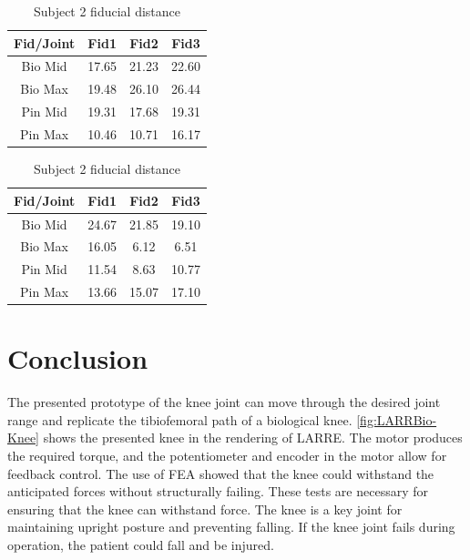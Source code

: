 \begin{table}
\begin{subtable}[c]{0.5\textwidth}
    \centering
        \begin{tabular}{||c | c c c||} 
         \hline
          Fid/Joint & Fid1 & Fid2 & Fid3  \\ [0.5ex] 
         \hline\hline
         Bio Mid & 17.65 & 21.23 & 22.60 \\ 
         \hline
         Bio Max & 19.48 & 26.10 & 26.44 \\
         \hline
         Pin Mid & 19.31 & 17.68 & 19.31 \\
         \hline
         Pin Max & 10.46 & 10.71 & 16.17 \\ [1ex] 
         \hline
        \end{tabular}
    \end{subtable}
        \begin{subtable}[c]{0.5\textwidth}
    \centering
    \begin{tabular}{||c | c c c||} 
         \hline
          Fid/Joint & Fid1 & Fid2 & Fid3  \\ [0.5ex] 
         \hline\hline
         Bio Mid & 24.67 & 21.85 & 19.10 \\ 
         \hline
         Bio Max & 16.05 & 6.12 & 6.51 \\
         \hline
         Pin Mid & 11.54 & 8.63 & 10.77 \\
         \hline
         Pin Max & 13.66 & 15.07 & 17.10 \\ [1ex] 
         \hline
        \end{tabular}
    \end{subtable}
\caption{Subject 2 fiducial distance}
\label{tab:sub2MRI}
\end{table}



\section{Conclusion}

The presented prototype of the knee joint can move through the desired joint range and replicate the tibiofemoral path of a biological knee. \autoref{fig:LARRBio-Knee} shows the presented knee in the rendering of LARRE. The motor produces the required torque, and the potentiometer and encoder in the motor allow for feedback control. The use of FEA showed that the knee could withstand the anticipated forces without structurally failing. These tests are necessary for ensuring that the knee can withstand force. The knee is a key joint for maintaining upright posture and preventing falling. If the knee joint fails during operation, the patient could fall and be injured. 

